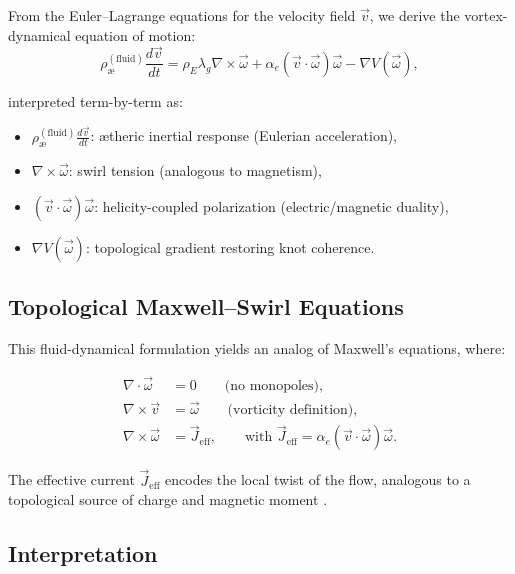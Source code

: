 \documentclass[preprint]{revtex4-2}
\begin{document}
From the Euler--Lagrange equations for the velocity field \( \vec{v} \), we derive the vortex-dynamical equation of motion:
\begin{equation}
\label{eq:VAM_dynamics}
\rho_\text{\ae}^{(\text{fluid})} \frac{d \vec{v}}{dt} =
\rho_{\scriptscriptstyle\boldsymbol\!E}\lambda_g \nabla \times \vec{\omega}
+ \alpha_e (\vec{v} \cdot \vec{\omega}) \vec{\omega}
- \nabla V(\vec{\omega}),
\end{equation}

interpreted term-by-term as:
\begin{itemize}
    \item \( \rho_\text{\ae}^{(\text{fluid})} \frac{d \vec{v}}{dt} \): ætheric inertial response (Eulerian acceleration),
    \item \( \nabla \times \vec{\omega} \): swirl tension (analogous to magnetism),
    \item \( (\vec{v} \cdot \vec{\omega}) \vec{\omega} \): helicity-coupled polarization (electric/magnetic duality),
    \item \( \nabla V(\vec{\omega}) \): topological gradient restoring knot coherence.
\end{itemize}

\subsection*{Topological Maxwell–Swirl Equations}

This fluid-dynamical formulation yields an analog of Maxwell’s equations, where:

\begin{align}
\nabla \cdot \vec{\omega} &= 0 \qquad \text{(no monopoles)}, \label{eq:divB} \\
\nabla \times \vec{v} &= \vec{\omega} \qquad \text{(vorticity definition)}, \label{eq:curlE} \\
\nabla \times \vec{\omega} &= \vec{J}_\text{eff}, \qquad \text{with } \vec{J}_\text{eff} = \alpha_e (\vec{v} \cdot \vec{\omega}) \vec{\omega}. \label{eq:ampere}
\end{align}

The effective current \( \vec{J}_\text{eff} \) encodes the local twist of the flow, analogous to a topological source of charge and magnetic moment \cite{yakovenko2021fluid, finn2020helicity}.

\subsection*{Interpretation}
\end{document}
